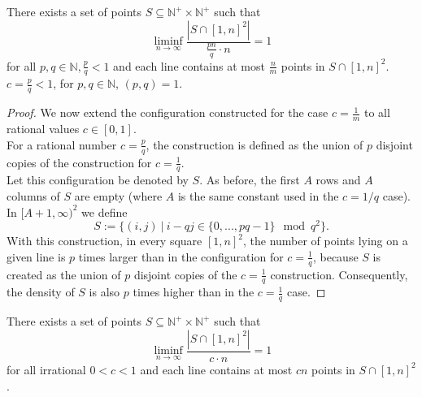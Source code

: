 \documentclass[11pt,a4paper]{article}
\numberwithin{equation}{section}
\newcommand{\nn}{\mathbb{N}}
\begin{document}
\bigskip
\begin{claim} \label{claimpperq}
    There exists a set of points $S\subseteq\nn^+\times \nn^+$ such that
    $$\displaystyle\liminf_{n\to\infty} \frac{|S\cap [1,n]^2|}{\frac{pn}{q}\cdot n} = 1$$
    for all $p,q \in \nn, \frac{p}{q}<1$ and each line contains at most $\frac{n}{m}$ points in $S\cap [1,n]^2$.
    $c=\frac{p}{q}<1$, for $p,q \in \nn$, $(p,q) = 1$.
\end{claim}
\begin{proof}
    We now extend the configuration constructed for the case $c=\frac{1}{m}$ to all rational values $c\in[0,1]$.\\
    For a rational number $c=\frac{p}{q}$, the construction is defined as the union of $p$ disjoint copies of the construction for $c=\frac{1}{q}$.\\
    Let this configuration be denoted by $S$. As before, the first $A$ rows and $A$ columns of $S$ are empty (where $A$ is the same constant used in the $c = 1/q$ case). In $[A+1, \infty)^2$ we define $$S := \{(i, j)\  |\  i-qj \in \{ 0, ..., pq-1\} \mod q^2\}.$$ 
    With this construction, in every square $[1,n]^2$, the number of points lying on a given line is $p$ times larger than in the configuration for $c=\frac{1}{q}$, because $S$ is created as the union of $p$ disjoint copies of the $c=\frac{1}{q}$ construction. Consequently, the density of $S$ is also $p$ times higher than in the $c=\frac{1}{q}$ case.
\end{proof}

\begin{claim} \label{claimirrac}
    There exists a set of points $S\subseteq\nn^+\times \nn^+$ such that
    \begin{equation} \label{eqirrac}
        \displaystyle\liminf_{n\to\infty} \frac{|S\cap [1,n]^2|}{c\cdot n} = 1
    \end{equation}
    for all irrational $0<c<1$ and each line contains at most $cn$ points in $S\cap [1,n]^2$.
\end{claim} 
\end{document}

